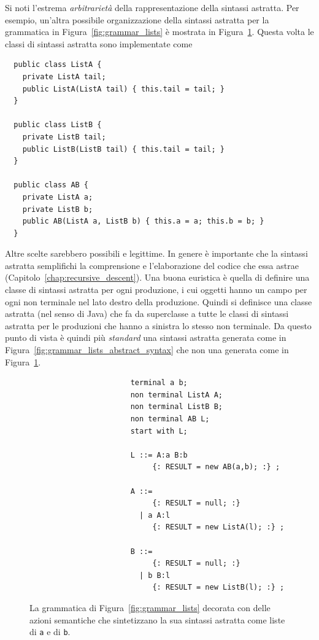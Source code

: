 Si noti l'estrema \emph{arbitrariet\`a} della rappresentazione
della sintassi astratta. Per esempio, un'altra possibile organizzazione
della sintassi astratta per la grammatica in Figura~\ref{fig:grammar_lists}
\`e mostrata in Figura~\ref{fig:grammar_lists_abstract_syntax2}.
Questa volta le classi di sintassi astratta sono implementate come
%
\begin{verbatim}
  public class ListA {
    private ListA tail;
    public ListA(ListA tail) { this.tail = tail; }
  }

  public class ListB {
    private ListB tail;
    public ListB(ListB tail) { this.tail = tail; }
  }

  public class AB {
    private ListA a;
    private ListB b;
    public AB(ListA a, ListB b) { this.a = a; this.b = b; }
  }
\end{verbatim}

Altre scelte sarebbero possibili e legittime. In genere \`e importante
che la sintassi astratta semplifichi la comprensione e l'elaborazione
del codice che essa astrae (Capitolo~\ref{chap:recursive_descent}).
Una buona euristica \`e quella di definire una classe di sintassi astratta
per ogni produzione, i cui oggetti hanno un campo per ogni non terminale
nel lato destro della produzione. Quindi si definisce una classe astratta
(nel senso di Java) che fa da superclasse a tutte le classi di sintassi
astratta per le produzioni che hanno a sinistra lo stesso non terminale. Da
questo punto di vista \`e quindi
pi\`u \emph{standard} una sintassi astratta generata come in
Figura~\ref{fig:grammar_lists_abstract_syntax} che non una generata come in
Figura~\ref{fig:grammar_lists_abstract_syntax2}.
%
\begin{figure}[t]
\begin{verbatim}
                       terminal a b;
                       non terminal ListA A;
                       non terminal ListB B;
                       non terminal AB L;
                       start with L;

                       L ::= A:a B:b
                            {: RESULT = new AB(a,b); :} ;

                       A ::=
                            {: RESULT = null; :}
                         | a A:l
                            {: RESULT = new ListA(l); :} ;

                       B ::=
                            {: RESULT = null; :}
                         | b B:l
                            {: RESULT = new ListB(l); :} ;
\end{verbatim}
\caption{La grammatica di Figura~\ref{fig:grammar_lists} decorata con delle
         azioni semantiche che sintetizzano la sua sintassi astratta
         come liste di \texttt{a} e di \texttt{b}.}
  \label{fig:grammar_lists_abstract_syntax2}
\end{figure}


